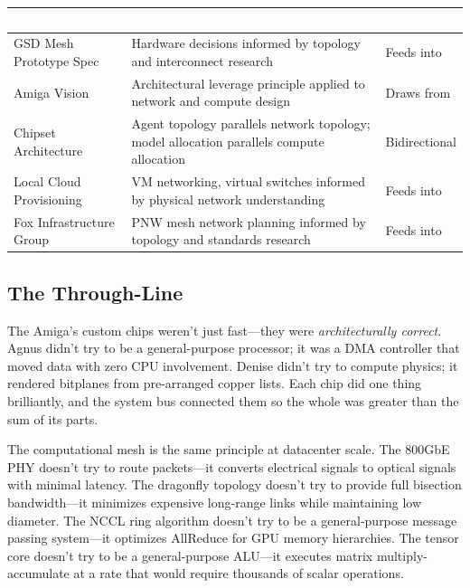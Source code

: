 \documentclass[11pt,letterpaper]{article}
\newcommand{\tableheader}[1]{\textbf{\sffamily\textcolor{white}{#1}}}
\begin{document}
\begin{center}
\begin{tabularx}{\textwidth}{L{4cm}XC{2.5cm}}
\toprule
{}
\tableheader{Document} & \tableheader{Relationship} & \tableheader{Direction} \\
\midrule
GSD Mesh Prototype Spec & Hardware decisions informed by topology and interconnect research & Feeds into \\
Amiga Vision & Architectural leverage principle applied to network and compute design & Draws from \\
Chipset Architecture & Agent topology parallels network topology; model allocation parallels compute allocation & Bidirectional \\
Local Cloud Provisioning & VM networking, virtual switches informed by physical network understanding & Feeds into \\
Fox Infrastructure Group & PNW mesh network planning informed by topology and standards research & Feeds into \\
\bottomrule
\end{tabularx}
\end{center}

\subsection{The Through-Line}

The Amiga's custom chips weren't just fast---they were \emph{architecturally correct}. Agnus didn't try to be a general-purpose processor; it was a DMA controller that moved data with zero CPU involvement. Denise didn't try to compute physics; it rendered bitplanes from pre-arranged copper lists. Each chip did one thing brilliantly, and the system bus connected them so the whole was greater than the sum of its parts.

The computational mesh is the same principle at datacenter scale. The 800GbE PHY doesn't try to route packets---it converts electrical signals to optical signals with minimal latency. The dragonfly topology doesn't try to provide full bisection bandwidth---it minimizes expensive long-range links while maintaining low diameter. The NCCL ring algorithm doesn't try to be a general-purpose message passing system---it optimizes AllReduce for GPU memory hierarchies. The tensor core doesn't try to be a general-purpose ALU---it executes matrix multiply-accumulate at a rate that would require thousands of scalar operations.
\end{document}
